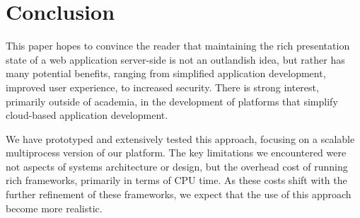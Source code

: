 \section{Conclusion}
\label{sec:conclu}

This paper hopes to convince the reader that maintaining the rich presentation state 
of a web application server-side is not an outlandish idea, but rather has many potential
benefits, ranging from simplified application development, improved user experience, to
increased security.  There is strong interest,
primarily outside of academia, in the development of platforms that simplify cloud-based 
application development.

We have prototyped and extensively tested this approach, focusing on a scalable
multiprocess version of our \cb{} platform.
The key limitations we encountered were not aspects of systems architecture or design, 
but the overhead cost of running rich frameworks, primarily in terms of CPU time.  
As these costs shift with the further refinement of these frameworks, we expect that
the use of this approach become more realistic.

